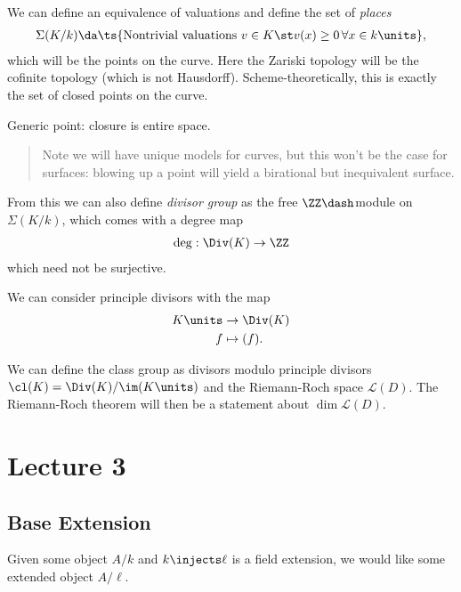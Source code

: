 We can define an equivalence of valuations and define the set of
\emph{places}
\begin{align*}  
\Sigma(K/k) \da \ts{\text{Nontrivial valuations } v\in K \st v(x) \geq 0\, \forall x\in k\units}
,\end{align*} which will be the points on the curve. Here the Zariski
topology will be the cofinite topology (which is not Hausdorff).
Scheme-theoretically, this is exactly the set of closed points on the
curve.

\begin{definition}[?]

Generic point: closure is entire space.

\end{definition}

\begin{quote}
Note we will have unique models for curves, but this won't be the case
for surfaces: blowing up a point will yield a birational but
inequivalent surface.
\end{quote}

From this we can also define \emph{divisor group} as the free
\(\ZZ\dash\)module on \(\Sigma(K/k)\), which comes with a degree map
\begin{align*}  
\deg: \Div(K) \to \ZZ
\end{align*} which need not be surjective.

We can consider principle divisors with the map
\begin{align*}  
K\units &\to \Div(K) \\
f &\mapsto (f)
.\end{align*}

We can define the class group as divisors modulo principle divisors
\(\cl(K) = \Div(K) / \im(K\units)\) and the Riemann-Roch space
\(\mathcal{L}(D)\). The Riemann-Roch theorem will then be a statement
about \(\dim \mathcal{L}(D)\).

\hypertarget{lecture-3}{%
\section{Lecture 3}\label{lecture-3}}

\hypertarget{base-extension}{%
\subsection{Base Extension}\label{base-extension}}

Given some object \(A/k\) and \(k\injects \ell\) is a field extension,
we would like some extended object \(A/\ell\).

